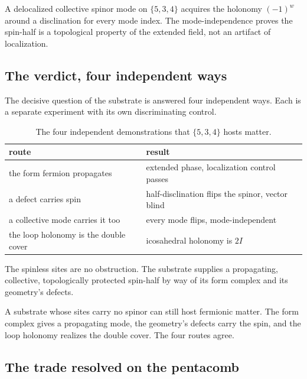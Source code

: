 \begin{result}
A delocalized collective spinor mode on $\{5,3,4\}$ acquires the holonomy $(-1)^w$ around a disclination for every mode index. The mode-independence proves the spin-half is a topological property of the extended field, not an artifact of localization.
\end{result}

\subsection{The verdict, four independent ways}

The decisive question of the substrate is answered four independent ways. Each is a separate experiment with its own discriminating control.

\begin{table}[ht]
\centering
\begin{tabular}{@{}ll@{}}
\toprule
route & result \\
\midrule
the form fermion propagates & extended phase, localization control passes \\
a defect carries spin & half-disclination flips the spinor, vector blind \\
a collective mode carries it too & every mode flips, mode-independent \\
the loop holonomy is the double cover & icosahedral holonomy is $2I$ \\
\bottomrule
\end{tabular}
\caption{The four independent demonstrations that $\{5,3,4\}$ hosts matter.}
\label{tab:verdict-534}
\end{table}

The spinless sites are no obstruction. The substrate supplies a propagating, collective, topologically protected spin-half by way of its form complex and its geometry's defects.

\begin{principle}
A substrate whose sites carry no spinor can still host fermionic matter. The form complex gives a propagating mode, the geometry's defects carry the spin, and the loop holonomy realizes the double cover. The four routes agree.
\end{principle}

\subsection{The trade resolved on the pentacomb}

